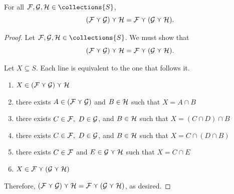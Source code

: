 \begin{theorem}
    \label{thm_classcap_associative}
    For all $\family, \familytwo, \familythree \in \collections{S}$,
    \[(\mathcal{F} \curlyvee \mathcal{G}) \curlyvee \mathcal{H} = \mathcal{F} \curlyvee (\mathcal{G} \curlyvee \mathcal{H}).\]
\end{theorem}

\begin{proof}
     Let $\family, \familytwo, \familythree \in \collections{S}$.  We must show that
    \[(\mathcal{F} \curlyvee \mathcal{G}) \curlyvee \mathcal{H} = \mathcal{F} \curlyvee (\mathcal{G} \curlyvee \mathcal{H}).\]


    Let $X \subseteq S$. Each line is equivalent to the one that follows it.
    \begin{enumerate}
        \item $X \in (\mathcal{F} \curlyvee \mathcal{G}) \curlyvee \mathcal{H}$
        \item there exists $A \in (\mathcal{F} \curlyvee \mathcal{G})$ and $B \in \mathcal{H}$ such that $X = A \cap B$
        \item there exists $C \in \mathcal{F}, \ D \in \mathcal{G}$, and $B \in \mathcal{H}$ such that $X = (C \cap D) \cap B$
        \item there exists $C \in \mathcal{F}, \ D \in \mathcal{G}$, and $B \in \mathcal{H}$ such that $X = C \cap (D \cap B)$
        \item there exists $C \in \mathcal{F}$ and $E \in \mathcal{G} \curlyvee \mathcal{H}$ such that $X = C \cap E$
        \item $X \in \mathcal{F} \curlyvee (\mathcal{G} \curlyvee \mathcal{H})$
    \end{enumerate}
    Therefore, $(\mathcal{F} \curlyvee \mathcal{G}) \curlyvee \mathcal{H} = \mathcal{F} \curlyvee (\mathcal{G} \curlyvee \mathcal{H})$, as desired.
\end{proof}

